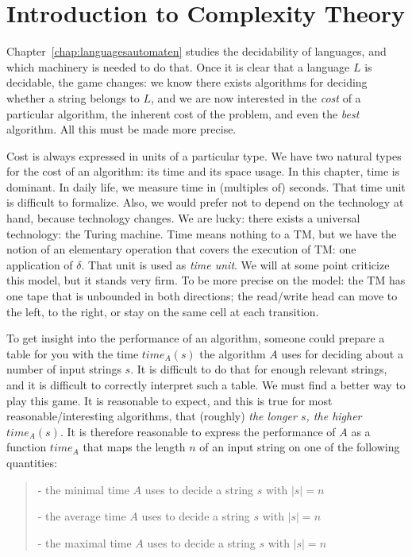 
\chapter{Introduction to Complexity Theory}


Chapter~\ref{chap:languagesautomaten} studies the decidability of
languages, and which machinery is needed to do that. Once it is clear
that a language $L$ is decidable, the game changes: we know there
exists algorithms for deciding whether a string belongs to $L$, and we
are now interested in the {\em cost} of a particular algorithm, the
inherent cost of the problem, and even the {\em best} algorithm. All
this must be made more precise.

Cost is always expressed in units of a particular type. We have two
natural types for the cost of an algorithm: its time and its space
usage. In this chapter, time is dominant. In daily life, we measure
time in (multiples of) seconds. That time unit is difficult to
formalize. Also, we would prefer not to depend on the technology at
hand, because technology changes. We are lucky: there exists a
universal technology: the Turing machine. Time means nothing to a TM,
but we have the notion of an elementary operation that covers the
execution of TM: one application of $\delta$. That unit is used as
{\em time unit}. We will at some point criticize this model, but it
stands very firm. To be more precise on the model: the TM has one
tape that is unbounded in both directions; the read/write head can
move to the left, to the right, or stay on the same cell at each
transition.

To get insight into the performance of an algorithm, someone could
prepare a table for you with the time $time_A(s)$ the algorithm $A$
uses for deciding about a number of input strings $s$.
It is difficult to do that for enough relevant strings, and it is
difficult to correctly interpret such a table. We must find a better
way to play this game. It is reasonable to expect, and this is true
for most reasonable/interesting algorithms, that (roughly) {\em the
longer $s$, the higher $time_A(s)$}. It is therefore reasonable to
express the performance of $A$ as a function $time_A$ that maps the
length $n$ of an input string on one of the following quantities:

\begin{verse}
- the minimal time $A$ uses to decide a  string $s$ with $|s| = n$

- the average time $A$ uses to decide a  string $s$ with $|s| = n$

- the maximal time $A$ uses to decide a  string $s$ with $|s| = n$
\end{verse}

